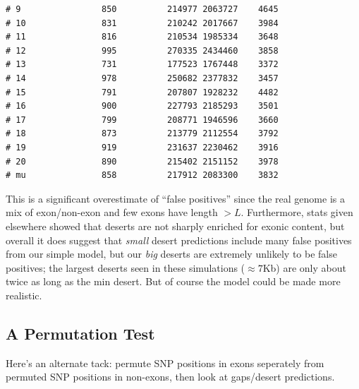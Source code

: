 \documentclass{article}\usepackage[]{graphicx}\usepackage[]{color}
\makeatletter
\newenvironment{kframe}{%
 \def\at@end@of@kframe{}%
 \ifinner\ifhmode%
  \def\at@end@of@kframe{\end{minipage}}%
  \begin{minipage}{\columnwidth}%
 \fi\fi%
 \def\FrameCommand##1{\hskip\@totalleftmargin \hskip-\fboxsep
 \colorbox{shadecolor}{##1}\hskip-\fboxsep
     \hskip-\linewidth \hskip-\@totalleftmargin \hskip\columnwidth}%
 \MakeFramed {\advance\hsize-\width
   \@totalleftmargin\z@ \linewidth\hsize
   \@setminipage}}%
 {\par\unskip\endMakeFramed%
 \at@end@of@kframe}
\newenvironment{knitrout}{}{} %
\makeatother
\begin{document}
\begin{knitrout}
\begin{kframe}
\begin{verbatim}
# 9                850          214977 2063727    4645
# 10               831          210242 2017667    3984
# 11               816          210534 1985334    3648
# 12               995          270335 2434460    3858
# 13               731          177523 1767448    3372
# 14               978          250682 2377832    3457
# 15               791          207807 1928232    4482
# 16               900          227793 2185293    3501
# 17               799          208771 1946596    3660
# 18               873          213779 2112554    3792
# 19               919          231637 2230462    3916
# 20               890          215402 2151152    3978
# mu               858          217912 2083300    3832
\end{verbatim}
\end{kframe}
\end{knitrout}

This is a significant overestimate of ``false positives'' since the real genome is a mix of exon/non-exon and few exons have length $>L$.  Furthermore, stats given elsewhere showed that deserts are not sharply enriched for exonic content, but overall it does suggest that \textit{small} desert predictions include many false positives from our simple model, but our \textit{big} deserts are extremely unlikely to be false positives; the largest deserts seen in these simulations ($\approx7$Kb) are only about twice as long as the min desert.  But of course the model could be made more realistic.

\subsection{A Permutation Test}
Here's an alternate tack:  permute SNP positions in exons seperately from permuted SNP positions in non-exons, then look at gaps/desert predictions.
\end{document}
